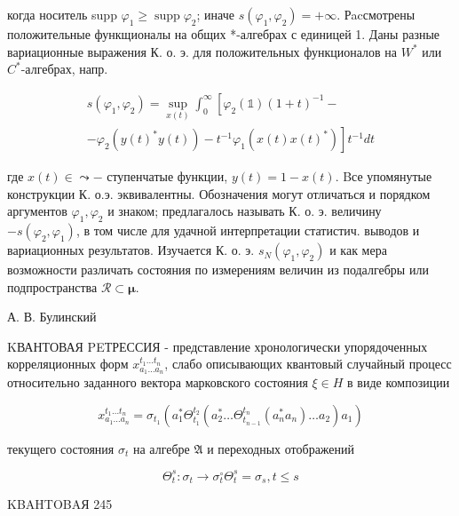 \documentclass[10pt]{article}
\begin{document}
когда носитель supp $\varphi_{1} \geqslant \operatorname{supp} \varphi_{2}$; иначе $s\left(\varphi_{1}, \varphi_{2}\right)=+\infty$. Рacсмотрены положительные функщионалы на общих *-алгебрах с единицей 1. Даны разные вариационные выражения К. о. э. для положительных функционалов на $W^{*}$ или $C^{*}$-алгебрах, напр.



\[

\begin{gathered}

s\left(\varphi_{1}, \varphi_{2}\right)=\sup _{x(t)} \int_{0}^{\infty}\left[\varphi_{2}(\mathbb{1})(1+t)^{-1}-\right. \\

\left.-\varphi_{2}\left(y(t)^{*} y(t)\right)-t^{-1} \varphi_{1}\left(x(t) x(t)^{*}\right)\right] t^{-1} d t

\end{gathered}

\]



где $x(t) \in \leadsto-$ ступенчатые функции, $y(t)=1-x(t)$. Bсе упомянутые конструкции К. о.э. эквивалентны. Обозначения могут отличаться и порядком аргументов $\varphi_{1}, \varphi_{2}$ и знаком; предлагалось называть К. о. э. величину $-s\left(\varphi_{2}, \varphi_{1}\right)$, в том числе для удачной интерпретации статистич. выводов и вариационных результатов. Изучается К. о. э. $s_{N}\left(\varphi_{1}, \varphi_{2}\right)$ и как мера возможности различать состояния по измерениям величин из подалгебры или подпространства $\mathscr{R} \subset \boldsymbol{\mu}$.



А. В. Булинский



KВАНТОВАЯ PEТРЕССИЯ - представление хронологически упорядоченных корреляционных форм $x_{a_{1} \ldots a_{n}}^{t_{1} \ldots t_{n}}$, слабо описывающих квантовый случайный процесс относительно заданного вектора марковского состояния $\xi \in H$ в виде композиции



\[

x_{a_{1} \ldots a_{n}}^{t_{1} \ldots t_{n}}=\sigma_{t_{1}}\left(a_{1}^{*} \Theta_{t_{1}}^{t_{2}}\left(a_{2}^{*} \ldots \Theta_{t_{n-1}}^{t_{n}}\left(a_{n}^{*} a_{n}\right) \ldots a_{2}\right) a_{1}\right)

\]



текущего состояния $\sigma_{t}$ на алгебре $\mathfrak{A}$ и переходных отображений



\[

\Theta_{t}^{s}: \sigma_{t} \rightarrow \sigma_{t}^{\circ} \Theta_{t}^{s}=\sigma_{s}, t \leqslant s

\]



KBAHTOBAЯ 245
\end{document}
